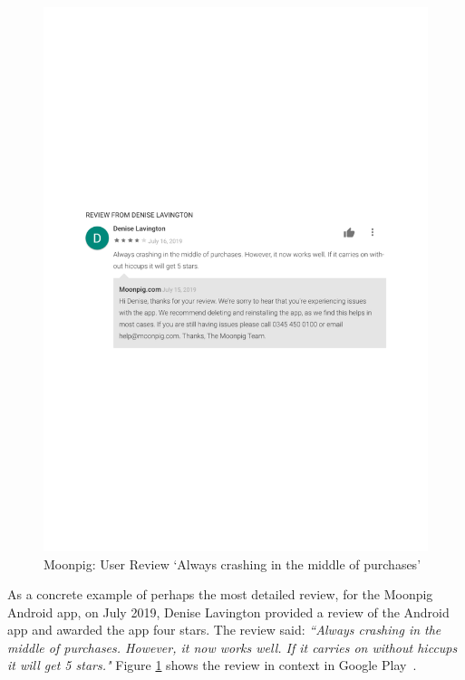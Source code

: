 \begin{figure}
    \centering
    \includegraphics[width=\linewidth]{images/google-play/Denise-Lavington-Review-moonpig-crashing-2019.pdf}
    \caption[Moonpig: User Review in Google Play `Always crashes...']{Moonpig: User Review `Always crashing in the middle of purchases'}
    \label{fig:gp-review-denise-lavington-always-crashes}
\end{figure}

As a concrete example of perhaps the most detailed review, for the Moonpig Android app, on  July 2019, Denise Lavington provided a review of the Android app and awarded the app four stars. The review said: \emph{``Always crashing in the middle of purchases. However, it now works well. If it carries on without hiccups it will get 5 stars."} Figure \ref{fig:gp-review-denise-lavington-always-crashes} shows the review in context in Google Play~.

